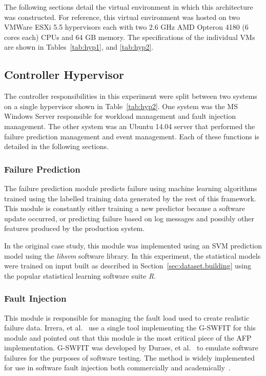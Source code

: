 \figannotatedAFP  

The following sections detail the virtual environment in which this
architecture was constructed.  For reference, this virtual environment was
hosted on two VMWare ESXi 5.5 hypervisors each with two 2.6 \ac{GHz} AMD
Opteron 4180 (6 cores each) \ac{CPU}s and 64 \ac{GB} memory.  The
specifications of the individual \ac{VM}s are shown in Tables~\ref{tab:hyp1},
and \ref{tab:hyp2}.

\tabHypervisorOne
\tabHypervisorTwo

\setcounter{secnumdepth}{5}

\subsection{Controller Hypervisor} \label{sec:controller} %
The controller responsibilities in this experiment were split between two
systems on a single hypervisor shown in Table~\ref{tab:hyp2}.  One system was
the \ac{MS} Windows Server responsible for workload management and fault
injection management.  The other system was an Ubuntu 14.04 server that
performed the failure prediction management and event management.  Each of
these functions is detailed in the following sections.

\subsubsection{Failure Prediction} \label{sec:failurePrediction} %
The failure prediction module predicts failure using machine learning
algorithms trained using the labelled training data generated by the rest of
this framework.  This module is constantly either training a new predictor
because a software update occurred, or predicting failure based on log messages
and possibly other features produced by the production system.

In the original case study, this module was implemented using an \ac{SVM}
prediction model using the \emph{libsvm} software library.  In this experiment,
the statistical models were trained on input built as described in
Section~\ref{sec:dataset.building} using the popular statistical learning
software suite \emph{R}.

\subsubsection{Fault Injection} \label{sec:faultInjectionMgr}
This module is responsible for managing the fault load used to create realistic
failure data.  Irrera, et al.~\cite{irrera2015} use a single tool implementing
the \ac{G-SWFIT} for this module and pointed out that this module is the most
critical piece of the \ac{AFP} implementation.  \ac{G-SWFIT} was developed by
Duraes, et al.~\cite{gswfit} to emulate software failures for the purposes of
software testing.  The method is widely implemented for use in software fault
injection both commercially and
academically~\cite{cotroneo2012,irrera2014,natella2010,umadevi2015}.  

